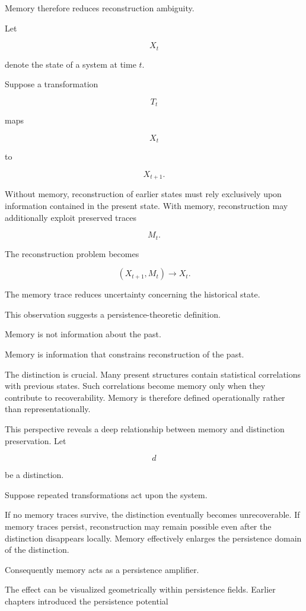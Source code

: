 \documentclass[12pt,oneside]{article}
\theoremstyle{definition}
\begin{document}
Memory therefore reduces reconstruction ambiguity.

Let

\[
X_t
\]

denote the state of a system at time \(t\).

Suppose a transformation

\[
T_t
\]

maps

\[
X_t
\]

to

\[
X_{t+1}.
\]

Without memory, reconstruction of earlier states must rely exclusively upon information contained in the present state. With memory, reconstruction may additionally exploit preserved traces

\[
M_t.
\]

The reconstruction problem becomes

\[
(X_{t+1},M_t)
\longrightarrow
X_t.
\]

The memory trace reduces uncertainty concerning the historical state.

This observation suggests a persistence-theoretic definition.

Memory is not information about the past.

Memory is information that constrains reconstruction of the past.

The distinction is crucial. Many present structures contain statistical correlations with previous states. Such correlations become memory only when they contribute to recoverability. Memory is therefore defined operationally rather than representationally.

This perspective reveals a deep relationship between memory and distinction preservation. Let

\[
d
\]

be a distinction.

Suppose repeated transformations act upon the system.

If no memory traces survive, the distinction eventually becomes unrecoverable. If memory traces persist, reconstruction may remain possible even after the distinction disappears locally. Memory effectively enlarges the persistence domain of the distinction.

Consequently memory acts as a persistence amplifier.

The effect can be visualized geometrically within persistence fields. Earlier chapters introduced the persistence potential
\end{document}
